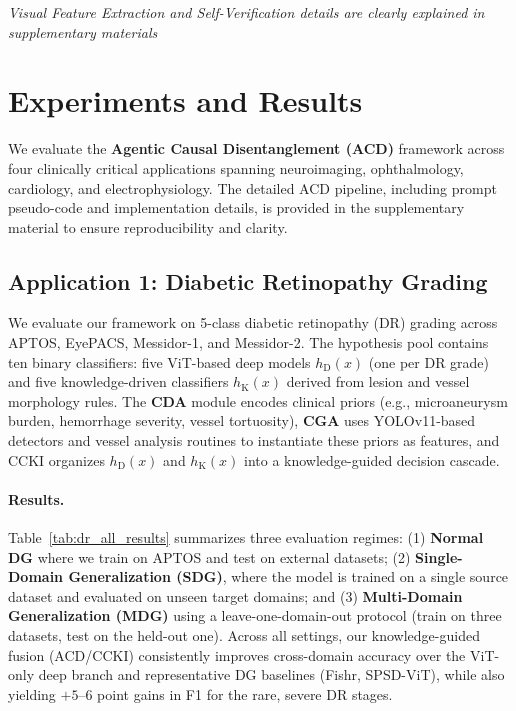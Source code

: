 \documentclass[runningheads]{llncs}
\begin{document}
\emph{Visual Feature Extraction and Self-Verification details are clearly explained in supplementary materials}
           

\section{Experiments and Results}
We evaluate the \textbf{Agentic Causal Disentanglement (ACD)} framework across four clinically critical applications spanning neuroimaging, ophthalmology, cardiology, and electrophysiology. The detailed ACD pipeline, including prompt pseudo-code and implementation details, is provided in the supplementary material to ensure reproducibility and clarity.
\vspace{-3mm}
\subsection{Application 1: Diabetic Retinopathy Grading}
We evaluate our framework on 5-class diabetic retinopathy (DR) grading across APTOS, EyePACS, Messidor-1, and Messidor-2. The hypothesis pool contains ten binary classifiers: five ViT-based deep models $h_{\mathrm{D}}(x)$ (one per DR grade) and five knowledge-driven classifiers $h_{\mathrm{K}}(x)$ derived from lesion and vessel morphology rules. The \textbf{CDA} module encodes clinical priors (e.g., microaneurysm burden, hemorrhage severity, vessel tortuosity), \textbf{CGA} uses YOLOv11-based detectors and vessel analysis routines to instantiate these priors as features, and CCKI organizes $h_{\mathrm{D}}(x)$ and $h_{\mathrm{K}}(x)$ into a knowledge-guided decision cascade.

\paragraph{Results.}
Table~\ref{tab:dr_all_results} summarizes three evaluation regimes: (1) \textbf{Normal DG} where we train on APTOS and test on external datasets; (2) \textbf{Single-Domain Generalization (SDG)}, where the model is trained on a single source dataset and evaluated on unseen target domains; and (3) \textbf{Multi-Domain Generalization (MDG)} using a leave-one-domain-out protocol (train on three datasets, test on the held-out one). Across all settings, our knowledge-guided fusion (ACD/CCKI) consistently improves cross-domain accuracy over the ViT-only deep branch and representative DG baselines (Fishr, SPSD-ViT), while also yielding $+5$--$6$ point gains in F1 for the rare, severe DR stages.
\end{document}
